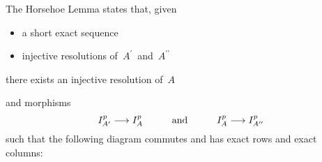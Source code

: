 \begin{itemize}
	The Horsehoe Lemma states that, given
	\begin{itemize}
	\item
		a short exact sequence
		\begin{center}
		\end{center}
	\item
		injective resolutions of \,$A^{\prime}$\, and \,$A^{\prime\prime}$\,
		\begin{center}
		\end{center}
	\end{itemize}
	there exists an injective resolution of \,$A$\,
		\begin{center}
		\end{center}
	and morphisms
	\begin{equation*}
	I^{p}_{A^{\prime}} \longrightarrow I^{p}_{A}
	\quad\quad\quad\textnormal{and}\quad\quad\quad
	I^{p}_{A} \longrightarrow I^{p}_{A^{\prime\prime}}
	\end{equation*}
	\vskip 0.2cm
	such that the following diagram commutes and has exact rows and exact columns:
	\begin{center}
\end{center}
\end{itemize}
